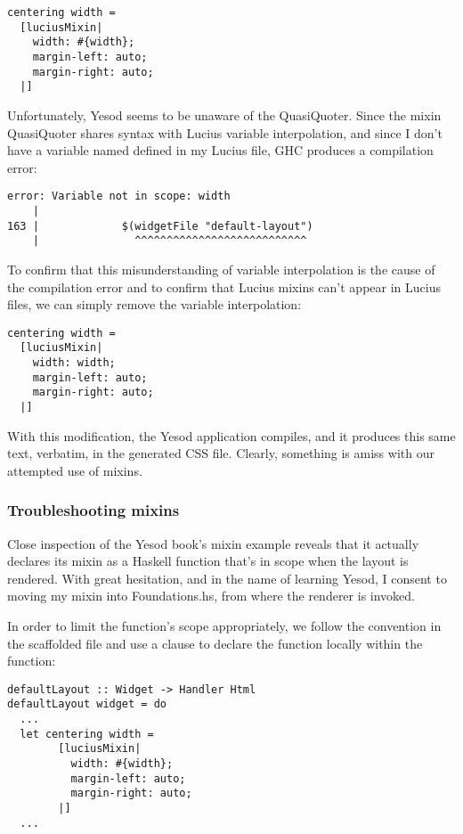 \begin{Verbatim}
centering width =
  [luciusMixin|
    width: #{width};
    margin-left: auto;
    margin-right: auto;
  |]
\end{Verbatim}

Unfortunately, Yesod seems to be unaware of the QuasiQuoter. Since the mixin QuasiQuoter shares syntax with Lucius variable interpolation, and since I don't have a variable named  defined in my Lucius file, GHC produces a compilation error:

\begin{Verbatim}
error: Variable not in scope: width
    |
163 |             $(widgetFile "default-layout")
    |               ^^^^^^^^^^^^^^^^^^^^^^^^^^^

\end{Verbatim}

To confirm that this misunderstanding of variable interpolation is the cause of the compilation error and to confirm that Lucius mixins can't appear in Lucius files, we can simply remove the variable interpolation:

\begin{Verbatim}
centering width =
  [luciusMixin|
    width: width;
    margin-left: auto;
    margin-right: auto;
  |]
\end{Verbatim}

With this modification, the Yesod application compiles, and it produces this same text, verbatim, in the generated CSS file. Clearly, something is amiss with our attempted use of mixins.

\subsubsection{Troubleshooting mixins} 

Close inspection of the Yesod book's mixin example \cite{ybkShakes} reveals that it actually declares its mixin as a Haskell function that's in scope when the layout is rendered. With great hesitation, and in the name of learning Yesod, I consent to moving my mixin into Foundations.hs, from where the renderer is invoked.

In order to limit the function's scope appropriately, we follow the convention in the scaffolded file and use a  clause to declare the function locally within the  function:

\begin{Verbatim}
defaultLayout :: Widget -> Handler Html
defaultLayout widget = do
  ...
  let centering width =
        [luciusMixin|
          width: #{width};
          margin-left: auto;
          margin-right: auto;
        |]
  ...
\end{Verbatim}

